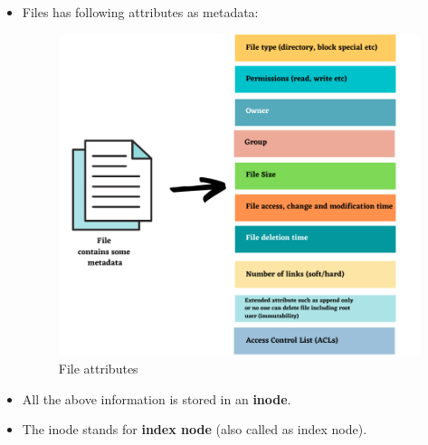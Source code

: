\setlength{\columnsep}{3pt}
\begin{flushleft}
	\bigskip
	\begin{itemize}
		\item Files has following attributes as metadata:
			\begin{figure}[h!]
				\centering
				\includegraphics[scale=.6]{content/chapter8/images/meta.png}
				\caption{File attributes}
				\label{fig:File_attributes}
			\end{figure}
		\item All the above information is stored in an \textbf{inode}. 
		\item The inode stands for \textbf{index node} (also called as index node).
	\end{itemize}
	
\end{flushleft}

\newpage

